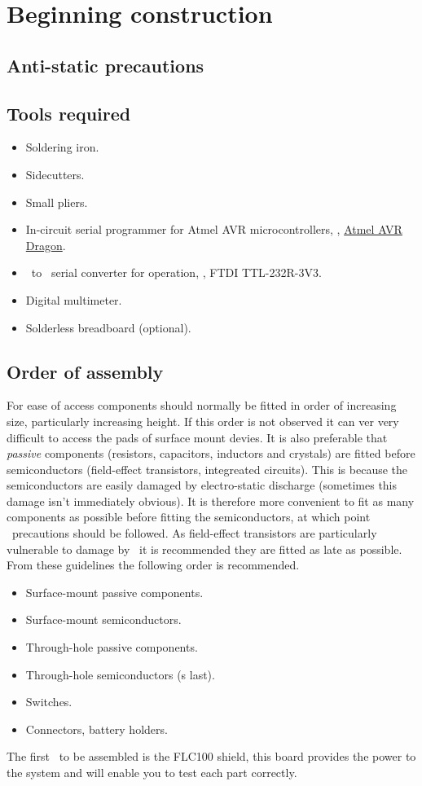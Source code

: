 \chapter{Beginning construction}

\section{Anti-static precautions}

\section{Tools required}

\begin{itemize}
\item Soldering iron.
\item Sidecutters.
\item Small pliers.
\item In-circuit serial programmer for Atmel AVR microcontrollers,
  \eg, \href{http://www.atmel.com/tools/AVRDRAGON.aspx}{Atmel AVR Dragon}.
\item \usb\ to \ttl\ serial converter for  operation, \eg, FTDI
  TTL-232R-3V3.
\item Digital multimeter.
\item Solderless breadboard (optional).
\end{itemize}

\section{Order of assembly}

For ease of access components should normally be fitted in order of
increasing size, particularly increasing height. If this order is not
observed it can ver very difficult to access the pads of surface mount
devies. It is also preferable that \emph{passive} components
(resistors, capacitors, inductors and crystals) are fitted before
semiconductors (field-effect transistors, integreated circuits). This
is because the semiconductors are easily damaged by electro-static
discharge (sometimes this damage isn't immediately obvious). It is
therefore more convenient to fit as many components as possible before
fitting the semiconductors, at which point \esd\ precautions should be
followed. As field-effect transistors are particularly vulnerable to
damage by \esd\ it is recommended they are fitted as late as possible.
From these guidelines the following order is recommended.
\begin{itemize}
\item Surface-mount passive components.
\item Surface-mount semiconductors.
\item Through-hole passive components.
\item Through-hole semiconductors (\fet s last).
\item Switches.
\item Connectors, battery holders.
\end{itemize}

The first \pcb\ to be assembled is the FLC100 shield, this board
provides the power to the system and will enable you to test each part
correctly.

